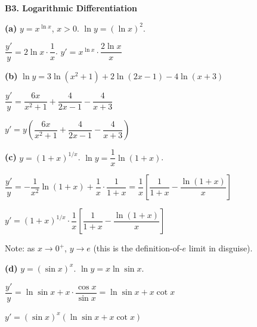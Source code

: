 \documentclass[12pt, a4paper]{article}
\theoremstyle{definition}
\begin{document}
\begin{solbox}
\textbf{B3. Logarithmic Differentiation}

\textbf{(a)} $y=x^{\ln x}$, $x>0$. $\ln y = (\ln x)^2$.

$\dfrac{y'}{y} = 2\ln x\cdot\dfrac{1}{x}$. \quad $y' = x^{\ln x}\cdot\dfrac{2\ln x}{x}$

\textbf{(b)} $\ln y = 3\ln(x^2+1)+2\ln(2x-1)-4\ln(x+3)$

$\dfrac{y'}{y} = \dfrac{6x}{x^2+1}+\dfrac{4}{2x-1}-\dfrac{4}{x+3}$

$y' = y\left(\dfrac{6x}{x^2+1}+\dfrac{4}{2x-1}-\dfrac{4}{x+3}\right)$

\textbf{(c)} $y=(1+x)^{1/x}$. $\ln y = \dfrac{1}{x}\ln(1+x)$.

$\dfrac{y'}{y} = -\dfrac{1}{x^2}\ln(1+x)+\dfrac{1}{x}\cdot\dfrac{1}{1+x}
= \dfrac{1}{x}\left[\dfrac{1}{1+x}-\dfrac{\ln(1+x)}{x}\right]$

$y' = (1+x)^{1/x}\cdot\dfrac{1}{x}\left[\dfrac{1}{1+x}-\dfrac{\ln(1+x)}{x}\right]$

Note: as $x\to 0^+$, $y\to e$ (this is the definition-of-$e$ limit in disguise).

\textbf{(d)} $y=(\sin x)^x$. $\ln y = x\ln\sin x$.

$\dfrac{y'}{y} = \ln\sin x + x\cdot\dfrac{\cos x}{\sin x} = \ln\sin x + x\cot x$

$y' = (\sin x)^x(\ln\sin x + x\cot x)$
\end{solbox}
\end{document}
